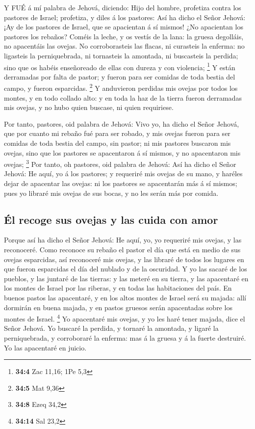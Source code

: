  Y FUÉ á mí palabra de Jehová, diciendo:  Hijo
del hombre, profetiza contra los pastores de Israel; profetiza, y diles
á los pastores: Así ha dicho el Señor Jehová: ¡Ay de los pastores de
Israel, que se apacientan á sí mismos! ¿No apacientan los pastores los
rebaños?  Coméis la leche, y os vestís de la lana: la gruesa
degolláis, no apacentáis las ovejas.  No corroborasteis las
flacas, ni curasteis la enferma: no ligasteis la perniquebrada, ni
tornasteis la amontada, ni buscasteis la perdida; sino que os habéis
enseñoreado de ellas con dureza y con violencia; \footnote{\textbf{34:4}
  Zac 11,16; 1Pe 5,3}  Y están derramadas por falta de
pastor; y fueron para ser comidas de toda bestia del campo, y fueron
esparcidas. \footnote{\textbf{34:5} Mat 9,36}  Y anduvieron
perdidas mis ovejas por todos los montes, y en todo collado alto: y en
toda la haz de la tierra fueron derramadas mis ovejas, y no hubo quien
buscase, ni quien requiriese.

 Por tanto, pastores, oid palabra de Jehová: 
Vivo yo, ha dicho el Señor Jehová, que por cuanto mi rebaño fué para ser
robado, y mis ovejas fueron para ser comidas de toda bestia del campo,
sin pastor; ni mis pastores buscaron mis ovejas, sino que los pastores
se apacentaron á sí mismos, y no apacentaron mis ovejas; \footnote{\textbf{34:8}
  Ezeq 34,2}  Por tanto, oh pastores, oid palabra de Jehová:
 Así ha dicho el Señor Jehová: He aquí, yo á los pastores;
y requeriré mis ovejas de su mano, y haréles dejar de apacentar las
ovejas: ni los pastores se apacentarán más á sí mismos; pues yo libraré
mis ovejas de sus bocas, y no les serán más por comida.

\hypertarget{uxe9l-recoge-sus-ovejas-y-las-cuida-con-amor}{%
\subsection{Él recoge sus ovejas y las cuida con
amor}\label{uxe9l-recoge-sus-ovejas-y-las-cuida-con-amor}}

 Porque así ha dicho el Señor Jehová: He aquí, yo, yo
requeriré mis ovejas, y las reconoceré.  Como reconoce su
rebaño el pastor el día que está en medio de sus ovejas esparcidas, así
reconoceré mis ovejas, y las libraré de todos los lugares en que fueron
esparcidas el día del nublado y de la oscuridad.  Y yo las
sacaré de los pueblos, y las juntaré de las tierras: y las meteré en su
tierra, y las apacentaré en los montes de Israel por las riberas, y en
todas las habitaciones del país.  En buenos pastos las
apacentaré, y en los altos montes de Israel será su majada: allí
dormirán en buena majada, y en pastos gruesos serán apacentadas sobre
los montes de Israel. \footnote{\textbf{34:14} Sal 23,2} 
Yo apacentaré mis ovejas, y yo les haré tener majada, dice el Señor
Jehová.  Yo buscaré la perdida, y tornaré la amontada, y
ligaré la perniquebrada, y corroboraré la enferma: mas á la gruesa y á
la fuerte destruiré. Yo las apacentaré en juicio.

